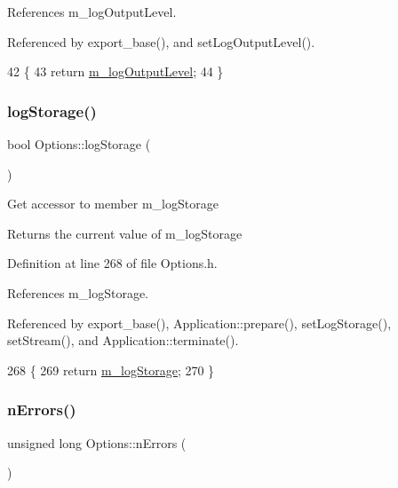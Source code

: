 References m\+\_\+log\+Output\+Level.



Referenced by export\+\_\+base(), and set\+Log\+Output\+Level().


\begin{DoxyCode}
42                                          \{
43                 \textcolor{keywordflow}{return} \hyperlink{classOptions_a9ecfefe6bf44ff519369f38eb5c8147a}{m\_logOutputLevel};
44         \}
\end{DoxyCode}
\mbox{\label{classOptions_a33735fffe17485937ab7579d8716b7ee}} 
\subsubsection{\texorpdfstring{log\+Storage()}{logStorage()}}
{\footnotesize\ttfamily bool Options\+::log\+Storage (\begin{DoxyParamCaption}{ }\end{DoxyParamCaption})\hspace{0.3cm}{\ttfamily [inline]}}

Get accessor to member m\+\_\+log\+Storage \begin{DoxyReturn}{Returns}
the current value of m\+\_\+log\+Storage 
\end{DoxyReturn}


Definition at line 268 of file Options.\+h.



References m\+\_\+log\+Storage.



Referenced by export\+\_\+base(), Application\+::prepare(), set\+Log\+Storage(), set\+Stream(), and Application\+::terminate().


\begin{DoxyCode}
268                            \{
269                 \textcolor{keywordflow}{return} \hyperlink{classOptions_ab7ffad5110df714233470725ef98be6e}{m\_logStorage};
270         \}
\end{DoxyCode}
\mbox{\label{classOptions_acc6474323f0bbe17fa844e9a086b90b8}} 
\subsubsection{\texorpdfstring{n\+Errors()}{nErrors()}}
{\footnotesize\ttfamily unsigned long Options\+::n\+Errors (\begin{DoxyParamCaption}{ }\end{DoxyParamCaption})\hspace{0.3cm}{\ttfamily [inline]}}

